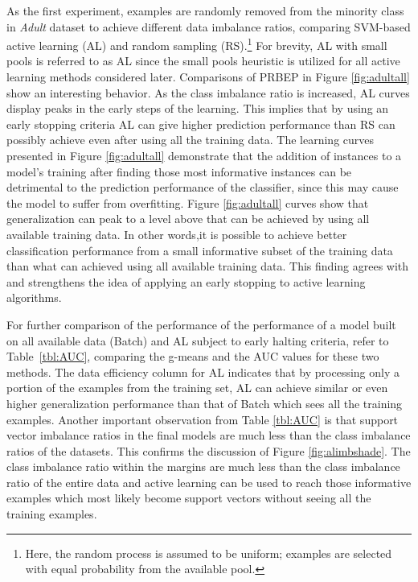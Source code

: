 As the first experiment, examples are randomly removed from the minority class in \emph{Adult} dataset to achieve different data imbalance ratios, comparing SVM-based active learning (AL) and random sampling (RS).\footnote{Here, the random process is assumed to be uniform; examples are selected with equal probability from the available pool.}    For brevity, AL with small pools is referred to as AL since the small pools heuristic is utilized for all active learning methods considered later. Comparisons of PRBEP in Figure \ref{fig:adultall} show an interesting behavior. As the class imbalance ratio is increased, AL curves display peaks in the early steps of the learning. This implies that by using an early stopping criteria AL can give higher prediction performance than RS can possibly achieve even after using all the training data. The learning curves presented in Figure \ref{fig:adultall} demonstrate that the addition of instances to a model's training after finding those most informative instances can be detrimental to the prediction performance of the classifier, since this may cause the model to suffer from overfitting. Figure \ref{fig:adultall} curves show that generalization can peak to a level above that can be achieved by using all available training data. In other words,it is possible to achieve better classification performance from a small informative subset of the training data than what can achieved using all available training data. This finding agrees with \cite{Schohn_2000} and strengthens the idea of applying an early stopping to active learning algorithms. 

For further comparison of the performance of the performance of a model built on all available data (Batch) and AL subject to early halting criteria, refer to Table~\ref{tbl:AUC}, comparing  the g-means and the AUC values for these two methods. The data efficiency column for AL indicates that by processing only a portion of the examples from the training set, AL can achieve similar or even higher generalization performance than that of Batch which sees all the training examples. Another important observation from Table \ref{tbl:AUC} is that support vector imbalance ratios in the final models are much less than the class imbalance ratios of the datasets. This confirms the discussion of Figure \ref{fig:alimbshade}. The class imbalance ratio within the margins are much less than the class imbalance ratio of the entire data and active learning can be used to reach those informative examples which most likely become support vectors without seeing all the training examples.


